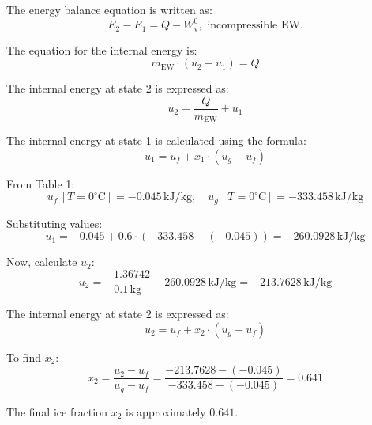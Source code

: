 The energy balance equation is written as:  
\[
E_2 - E_1 = Q - W_{\text{v}}^0, \text{ incompressible EW.}
\]  

The equation for the internal energy is:  
\[
m_{\text{EW}} \cdot (u_2 - u_1) = Q
\]  

The internal energy at state 2 is expressed as:  
\[
u_2 = \frac{Q}{m_{\text{EW}}} + u_1
\]  

The internal energy at state 1 is calculated using the formula:  
\[
u_1 = u_f + x_1 \cdot (u_g - u_f)
\]  

From Table 1:  
\[
u_f \, [T = 0^\circ\text{C}] = -0.045 \, \text{kJ/kg}, \quad u_g \, [T = 0^\circ\text{C}] = -333.458 \, \text{kJ/kg}
\]  

Substituting values:  
\[
u_1 = -0.045 + 0.6 \cdot (-333.458 - (-0.045)) = -260.0928 \, \text{kJ/kg}
\]  

Now, calculate \( u_2 \):  
\[
u_2 = \frac{-1.36742}{0.1 \, \text{kg}} - 260.0928 \, \text{kJ/kg} = -213.7628 \, \text{kJ/kg}
\]  

The internal energy at state 2 is expressed as:  
\[
u_2 = u_f + x_2 \cdot (u_g - u_f)
\]  

To find \( x_2 \):  
\[
x_2 = \frac{u_2 - u_f}{u_g - u_f} = \frac{-213.7628 - (-0.045)}{-333.458 - (-0.045)} = 0.641
\]  

The final ice fraction \( x_2 \) is approximately \( 0.641 \).